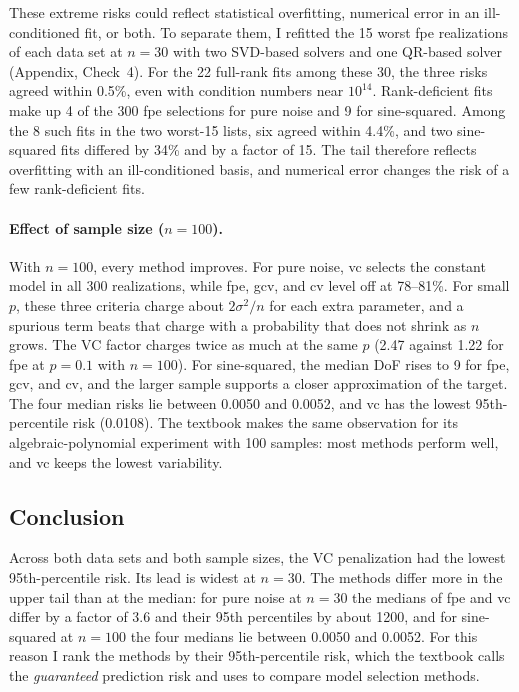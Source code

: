 These extreme risks could reflect statistical overfitting, numerical error in an ill-conditioned fit, or both. To
separate them, I refitted the 15 worst fpe realizations of each data set at $n = 30$ with two SVD-based solvers and
one QR-based solver (Appendix, Check~4). For the 22 full-rank fits among these 30, the three risks agreed within
0.5\%, even with condition numbers near $10^{14}$. Rank-deficient fits make up 4 of the 300 fpe selections for pure
noise and 9 for sine-squared. Among the 8 such fits in the two worst-15 lists, six agreed within 4.4\%, and two
sine-squared fits differed by 34\% and by a factor of 15. The tail therefore reflects overfitting with an
ill-conditioned basis, and numerical error changes the risk of a few rank-deficient fits.

\paragraph{Effect of sample size ($n = 100$).}
With $n = 100$, every method improves. For pure noise, vc selects the constant model in all 300 realizations, while
fpe, gcv, and cv level off at 78--81\%. For small $p$, these three criteria charge about $2\sigma^2/n$ for each extra
parameter, and a spurious term beats that charge with a probability that does not shrink as $n$ grows. The VC factor
charges twice as much at the same $p$ (2.47 against 1.22 for fpe at $p = 0.1$ with $n = 100$). For sine-squared, the median
DoF rises to 9 for fpe, gcv, and cv, and the larger sample supports a closer approximation of the target. The four
median risks lie between 0.0050 and 0.0052, and vc has the lowest 95th-percentile risk (0.0108). The textbook makes
the same observation for its algebraic-polynomial experiment with 100 samples: most methods perform well, and vc keeps
the lowest variability.

\subsection*{Conclusion}
Across both data sets and both sample sizes, the VC penalization had the lowest 95th-percentile risk. Its lead is
widest at $n = 30$. The methods differ more in the upper tail than at the median: for pure noise at $n = 30$ the
medians of fpe and vc differ by a factor of 3.6 and their 95th percentiles by about 1200, and for sine-squared at
$n = 100$ the four medians lie between 0.0050 and 0.0052. For this reason I rank the methods by their
95th-percentile risk, which the textbook calls the \emph{guaranteed} prediction risk and uses to compare model
selection methods.
